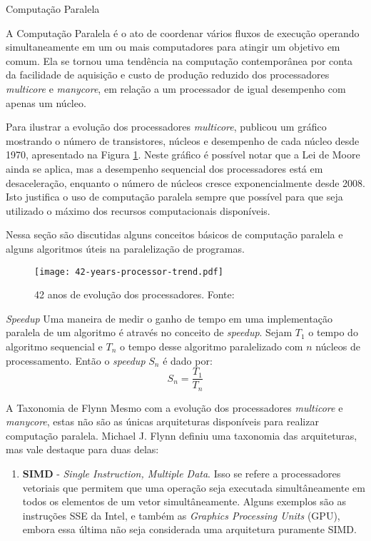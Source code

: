 \begin{section}{Computação Paralela}
\label{sec:parallel_comp}

    A Computação Paralela é o ato de coordenar vários fluxos de
execução operando simultaneamente em um ou mais computadores para
atingir um objetivo em comum. Ela se tornou uma tendência na
computação contemporânea por conta da facilidade de aquisição
e custo de produção reduzido dos processadores \textit{multicore}
e \textit{manycore}, em relação a um processador de igual desempenho
com apenas um núcleo.

    Para ilustrar a evolução dos processadores \textit{multicore}, \cite{42years}
    publicou um gráfico mostrando o número
de transistores, núcleos e desempenho de cada núcleo desde 1970,
apresentado na Figura \ref{fig:42years}.
Neste gráfico é possível notar que a Lei de Moore ainda se aplica,
mas a desempenho sequencial dos processadores está em desaceleração,
enquanto o número de núcleos cresce exponencialmente desde 2008. Isto
justifica o uso de computação paralela sempre que possível para que
seja utilizado o máximo dos recursos computacionais disponíveis.

    Nessa seção são discutidas alguns conceitos básicos de computação
paralela e alguns algoritmos úteis na paralelização de programas.

\begin{figure}[ht]
 \centering
 \texttt{[image: 42-years-processor-trend.pdf]}
 \caption{42 anos de evolução dos processadores. Fonte: \cite{42years}}
 \label{fig:42years}
\end{figure}

\begin{subsection}{\textit{Speedup}}
    Uma maneira de medir o ganho de tempo em uma implementação paralela
de um algoritmo é através no conceito de \textit{speedup}. Sejam $T_1$
o tempo do algoritmo sequencial e $T_n$ o tempo desse algoritmo paralelizado
    com $n$ núcleos de processamento. Então o \textit{speedup} $S_n$
é dado por:
    $$ S_n = \frac{T_1}{T_n} $$

\end{subsection}


\begin{subsection}{A Taxonomia de Flynn}
	Mesmo com a evolução dos processadores \textit{multicore} e
\textit{manycore}, estas não são as únicas arquiteturas disponíveis para
realizar computação paralela. Michael J. Flynn \citep{pacheco:2011} definiu
uma taxonomia das arquiteturas, mas vale destaque para duas delas:
\begin{enumerate}
    \item \textbf{SIMD} - \textit{Single Instruction, Multiple Data}. Isso se refere
        a processadores vetoriais que permitem que uma operação seja executada simultâneamente em
        todos os elementos de um vetor simultâneamente. Alguns exemplos são as
        instruções SSE da Intel, e também as \textit{Graphics Processing Units} (GPU),
        embora essa última não seja considerada uma arquitetura puramente SIMD.


\end{enumerate}
\end{subsection}
\end{section}
